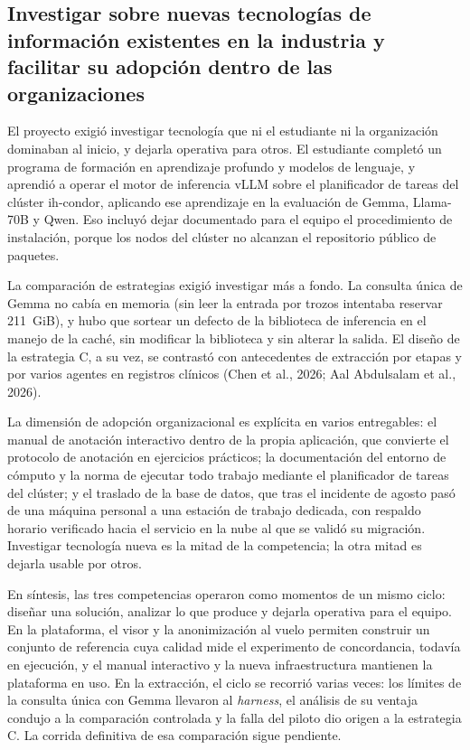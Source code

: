 \documentclass[12pt,letterpaper]{article}
\begin{document}
\subsection*{Investigar sobre nuevas tecnologías de información existentes en la industria y facilitar su adopción dentro de las organizaciones}

El proyecto exigió investigar tecnología que ni el estudiante ni la organización dominaban al inicio, y dejarla operativa para otros. El estudiante completó un programa de formación en aprendizaje profundo y modelos de lenguaje, y aprendió a operar el motor de inferencia vLLM sobre el planificador de tareas del clúster ih-condor, aplicando ese aprendizaje en la evaluación de Gemma, Llama-70B y Qwen. Eso incluyó dejar documentado para el equipo el procedimiento de instalación, porque los nodos del clúster no alcanzan el repositorio público de paquetes.

La comparación de estrategias exigió investigar más a fondo. La consulta única de Gemma no cabía en memoria (sin leer la entrada por trozos intentaba reservar 211~GiB), y hubo que sortear un defecto de la biblioteca de inferencia en el manejo de la caché, sin modificar la biblioteca y sin alterar la salida. El diseño de la estrategia C, a su vez, se contrastó con antecedentes de extracción por etapas y por varios agentes en registros clínicos (Chen et al., 2026; Aal Abdulsalam et al., 2026).

La dimensión de adopción organizacional es explícita en varios entregables: el manual de anotación interactivo dentro de la propia aplicación, que convierte el protocolo de anotación en ejercicios prácticos; la documentación del entorno de cómputo y la norma de ejecutar todo trabajo mediante el planificador de tareas del clúster; y el traslado de la base de datos, que tras el incidente de agosto pasó de una máquina personal a una estación de trabajo dedicada, con respaldo horario verificado hacia el servicio en la nube al que se validó su migración. Investigar tecnología nueva es la mitad de la competencia; la otra mitad es dejarla usable por otros.

En síntesis, las tres competencias operaron como momentos de un mismo ciclo: diseñar una solución, analizar lo que produce y dejarla operativa para el equipo. En la plataforma, el visor y la anonimización al vuelo permiten construir un conjunto de referencia cuya calidad mide el experimento de concordancia, todavía en ejecución, y el manual interactivo y la nueva infraestructura mantienen la plataforma en uso. En la extracción, el ciclo se recorrió varias veces: los límites de la consulta única con Gemma llevaron al \textit{harness}, el análisis de su ventaja condujo a la comparación controlada y la falla del piloto dio origen a la estrategia C. La corrida definitiva de esa comparación sigue pendiente.
\end{document}
